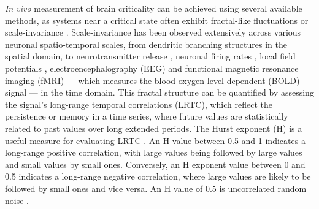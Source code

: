 \documentclass[
true
]{sn-jnl}
\begin{document}
\emph{In vivo} measurement of brain criticality can be achieved using
several available methods, as systems near a critical state often
exhibit fractal-like fluctuations or scale-invariance
\citep{munozColloquiumCriticalityDynamical2018}. Scale-invariance has
been observed extensively across various neuronal spatio-temporal
scales, from dendritic branching structures
\citep{casertaDeterminationFractalDimension1995} in the spatial domain,
to neurotransmitter release
\citep{lowenQuantalNeurotransmitterSecretion1997}, neuronal firing rates
\citep{mazzoniDynamicsSpontaneousActivity2007}, local field potentials
\citep{bedardMacroscopicModelsLocal2009}, electroencephalography (EEG)
\citep{bullmoreFractalAnalysisElectroencephalographic1994} and
functional magnetic resonance imaging (fMRI) --- which measures the
blood oxygen level-dependent (BOLD) signal
\citep{zarahnEmpiricalAnalysesBOLD1997, fadiliWaveletGeneralizedLeastSquares2002, campbellMonofractalAnalysisFunctional2022}
--- in the time domain. This fractal structure can be quantified by
assessing the signal's long-range temporal correlations (LRTC), which
reflect the persistence or memory in a time series, where future values
are statistically related to past values over long extended periods. The
Hurst exponent (H) is a useful measure for evaluating LRTC
\citep{ekeFractalCharacterizationComplexity2002, campbellMonofractalAnalysisFunctional2022}.
An H value between 0.5 and 1 indicates a long-range positive
correlation, with large values being followed by large values and small
values by small ones. Conversely, an H exponent value between 0 and 0.5
indicates a long-range negative correlation, where large values are
likely to be followed by small ones and vice versa. An H value of 0.5 is
uncorrelated random noise \citep{hurstLongTermStorageCapacity1951}.
\end{document}

